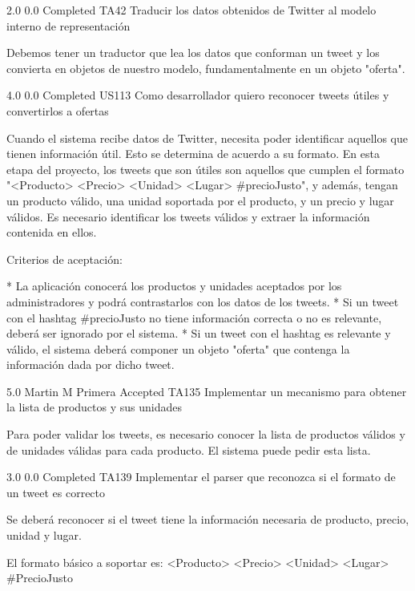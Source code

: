 		{2.0} %
		{} %
		{0.0} %
		{Completed} %
	\task
		{TA42} %
		{Traducir los datos obtenidos de Twitter al modelo interno de representación} %
		{Debemos tener un traductor que lea los datos que conforman un tweet y los
convierta en objetos de nuestro modelo, fundamentalmente en un objeto
"oferta".

} %
		{4.0} %
		{} %
		{0.0} %
		{Completed} %
\userStory
	{US113} %
	{Como desarrollador quiero reconocer tweets útiles y convertirlos a ofertas} %
	{Cuando el sistema recibe datos de Twitter, necesita poder identificar aquellos
que tienen información útil. Esto se determina de acuerdo a su formato. En
esta etapa del proyecto, los tweets que son útiles son aquellos que cumplen el
formato "<Producto> <Precio> <Unidad> <Lugar> #precioJusto", y además, tengan
un producto válido, una unidad soportada por el producto, y un precio y lugar
válidos. Es necesario identificar los tweets válidos y extraer la información
contenida en ellos.

  
Criterios de aceptación:

* La aplicación conocerá los productos y unidades aceptados por los administradores y podrá contrastarlos con los datos de los tweets.  
* Si un tweet con el hashtag #precioJusto no tiene información correcta o no es relevante, deberá ser ignorado por el sistema.  
* Si un tweet con el hashtag es relevante y válido, el sistema deberá componer un objeto "oferta" que contenga la información dada por dicho tweet.

} %
	{} %
	{5.0} %
	{Martin M} %
	{Primera} %
	{Accepted} %
	\task
		{TA135} %
		{Implementar un mecanismo para obtener la lista de productos y sus unidades} %
		{Para poder validar los tweets, es necesario conocer la lista de productos
válidos y de unidades válidas para cada producto. El sistema puede pedir esta
lista.

} %
		{3.0} %
		{} %
		{0.0} %
		{Completed} %
	\task
		{TA139} %
		{Implementar el parser que reconozca si el formato de un tweet es correcto} %
		{Se deberá reconocer si el tweet tiene la información necesaria de producto,
precio, unidad y lugar.

El formato básico a soportar es: <Producto> <Precio> <Unidad> <Lugar>
#PrecioJusto

} %
